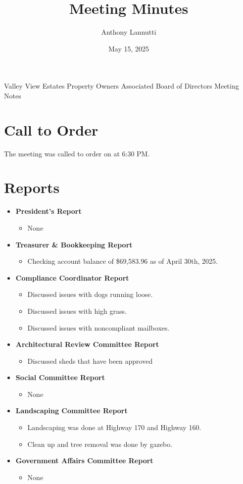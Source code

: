 \documentclass[12pt,a4paper]{article}
\author{Anthony Lannutti}
\date{May 15, 2025}
\title{Meeting Minutes}
\begin{document}
\begin{center}
  Valley View Estates Property Owners Associated Board of Directors Meeting Notes\break{}
  \@date{}
\end{center}

\section*{Call to Order}
\begin{flushleft}
The meeting was called to order on \@date{} at 6:30 PM\@.
\end{flushleft}


\section*{Reports}
\begin{itemize}
  \item \textbf{President's Report}
  \begin{itemize}
    \item None
  \end{itemize}
  \item \textbf{Treasurer \& Bookkeeping Report}
  \begin{itemize}
    \item Checking account balance of \$69,583.96 as of April 30th, 2025.
  \end{itemize}
  \item \textbf{Compliance Coordinator Report}
  \begin{itemize}
    \item Discussed issues with dogs running loose.
    \item Discussed issues with high grass.
    \item Discussed issues with noncompliant mailboxes.
  \end{itemize}
  \item \textbf{Architectural Review Committee Report}
  \begin{itemize}
    \item Discussed sheds that have been approved
  \end{itemize}
  \item \textbf{Social Committee Report}
  \begin{itemize}
    \item None
  \end{itemize}
  \item \textbf{Landscaping Committee Report}
  \begin{itemize}
    \item Landscaping was done at Highway 170 and Highway 160.
    \item Clean up and tree removal was done by gazebo.
  \end{itemize}
  \item \textbf{Government Affairs Committee Report}
  \begin{itemize}
    \item None
  \end{itemize}
\end{itemize}
\end{document}

